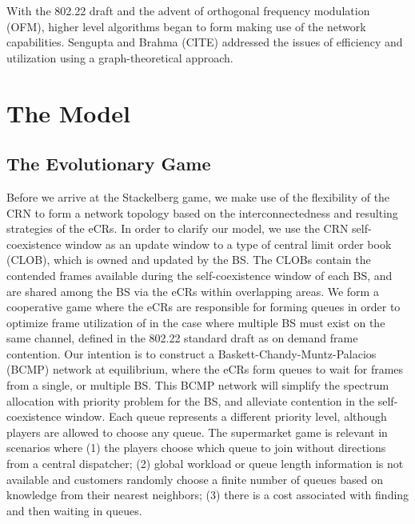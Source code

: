 \documentclass[10pt]{article}
\theoremstyle{definition}
\begin{document}
With the 802.22 draft and the advent of orthogonal frequency modulation (OFM),
higher level algorithms began to form making use of the network capabilities.
Sengupta and Brahma (CITE) addressed the issues of efficiency and utilization
using a graph-theoretical approach. 


\section{The Model}

\subsection{The Evolutionary Game}

Before we arrive at the Stackelberg game, we make use of the flexibility of the
CRN to form a network topology based on the interconnectedness and resulting
strategies of the eCRs. In order to clarify our model, we use the CRN 
self-coexistence window as an update window to
a type of central limit order book (CLOB), which is owned and updated by the BS. 
The CLOBs contain the contended frames available during the self-coexistence window 
of each BS, and are shared among the BS via the eCRs within overlapping
areas. We form a cooperative game where the eCRs are responsible for forming queues in order
to optimize frame utilization of in the case where multiple BS must exist on the
same channel, defined in the 802.22 standard draft as on demand frame
contention. Our intention is to construct a
Baskett-Chandy-Muntz-Palacios (BCMP) network at equilibrium, where the eCRs form
queues to wait for frames from a single, or multiple BS. This BCMP network will simplify the spectrum allocation
with priority
problem for the BS, and alleviate contention in the self-coexistence window.
Each queue represents a different priority level, although players are allowed to choose any queue.
The supermarket game is relevant in scenarios where (1) the players choose which
queue to join without directions from a central dispatcher; (2) global workload or
queue length information is not available and customers randomly choose a finite
number of queues based on knowledge from their nearest neighbors; (3) there is a cost
associated with finding and then waiting in queues.
\end{document}
